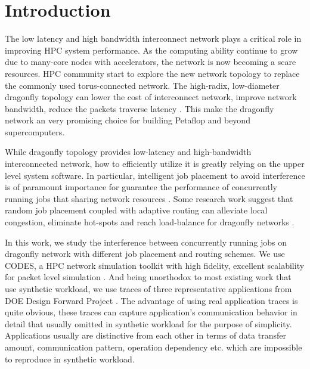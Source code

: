 \documentclass[conference,compsoc]{IEEEtran}
\begin{document}




%
\IEEEpeerreviewmaketitle



\section{Introduction}
\label{sec:intro}

The low latency and high bandwidth interconnect network plays a critical role in improving HPC system performance. As the computing ability continue to grow due to many-core nodes with accelerators, the network is now becoming a scare resources. HPC community start to explore the new network topology to replace the commonly used torus-connected network. The high-radix, low-diameter dragonfly topology can lower the cost of interconnect network, improve network bandwidth, reduce the packets traverse latency \cite{dally-dragonfly}. This make the dragonfly network an very promising choice for building Petaflop and beyond supercomputers. 


While dragonfly topology provides low-latency and high-bandwidth interconnected network, how to efficiently utilize it is greatly relying on the upper level system software. In particular, intelligent job placement to avoid interference is of paramount importance for guarantee the performance of concurrently running jobs that sharing network resources \cite{bhatele2015, dskinner}. Some research work suggest that random job placement coupled with adaptive routing can alleviate local congestion, eliminate hot-spots and reach load-balance for dragonfly networks \cite{jain-sc14, bhatele-sc11, brandt2014}. 


In this work, we study the interference between concurrently running jobs on dragonfly network with different job placement and routing schemes. We use CODES, a HPC network simulation toolkit with high fidelity, excellent scalability for packet level simulation \cite{codes}. And being unorthodox to most existing work that use synthetic workload, we use traces of three representative applications from DOE Design Forward Project \cite{designforwardwebpage}. The advantage of using real application traces is quite obvious, these traces can capture application's communication behavior in detail that usually omitted in synthetic workload for the purpose of simplicity. Applications usually are distinctive from each other in terms of data transfer amount, communication pattern, operation dependency etc. which are impossible to reproduce in synthetic workload.
\end{document}
